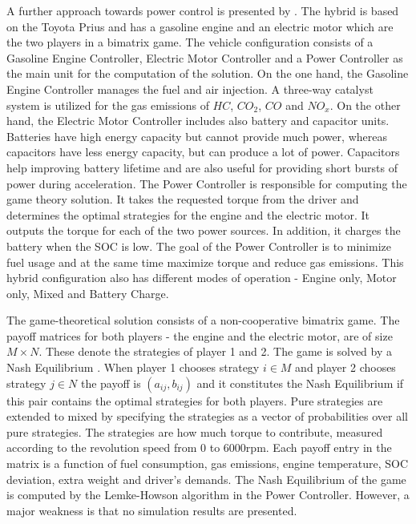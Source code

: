
A further approach towards power control is presented by \citet{chin2010design}. The hybrid is based on the Toyota Prius and has a gasoline engine and an electric motor which are the two players in a bimatrix game. The vehicle configuration consists of a Gasoline Engine Controller, Electric Motor Controller and a Power Controller as the main unit for the computation of the solution. On the one hand, the Gasoline Engine Controller manages the fuel and air injection. A three-way catalyst system is utilized for the gas emissions of $HC$, $CO_2$, $CO$ and $NO_x$. On the other hand, the Electric Motor Controller includes also battery and capacitor units. Batteries have high energy capacity but cannot provide much power, whereas capacitors have less energy capacity, but can produce a lot of power. Capacitors help improving battery lifetime and are also useful for providing short bursts of power during acceleration. The Power Controller is responsible for computing the game theory solution. It takes the requested torque from the driver and determines the optimal strategies for the engine and the electric motor. It outputs the torque for each of the two power sources. In addition, it charges the battery when the SOC is low. The goal of the Power Controller is to minimize fuel usage and at the same time maximize torque and reduce gas emissions. This hybrid configuration also has different modes of operation - Engine only, Motor only, Mixed and Battery Charge.

The game-theoretical solution consists of a non-cooperative bimatrix game. The payoff matrices for both players - the engine and the electric motor, are of size $M \times N$. These denote the strategies of player 1 and 2. The game is solved by a Nash Equilibrium \citep{nash1951non}. When player 1 chooses strategy $i \in M$ and player 2 chooses strategy $j \in N$ the payoff is $(a_{ij},b_{ij})$ and it constitutes the Nash Equilibrium if this pair contains the optimal strategies for both players. Pure strategies are extended to mixed by specifying the strategies as a vector of probabilities over all pure strategies. The strategies are how much torque to contribute, measured according to the revolution speed from 0 to 6000rpm. Each payoff entry in the matrix is a function of fuel consumption, gas emissions, engine temperature, SOC deviation, extra weight and driver's demands. The Nash Equilibrium of the game is computed by the Lemke-Howson algorithm \citep{lemke1964equilibrium} in the Power Controller. However, a major weakness is that no simulation results are presented.

